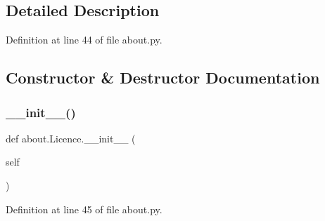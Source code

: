 \subsection{Detailed Description}


Definition at line 44 of file about.\+py.



\subsection{Constructor \& Destructor Documentation}
\mbox{\label{classabout_1_1_licence_a6c11624281f8710f2c1eb90c33285714}} 
\subsubsection{\texorpdfstring{\+\_\+\+\_\+init\+\_\+\+\_\+()}{\_\_init\_\_()}}
{\footnotesize\ttfamily def about.\+Licence.\+\_\+\+\_\+init\+\_\+\+\_\+ (\begin{DoxyParamCaption}\item[{}]{self }\end{DoxyParamCaption})}



Definition at line 45 of file about.\+py.


